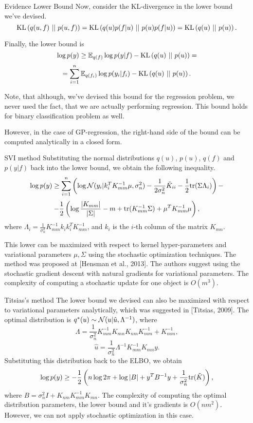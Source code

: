 \begin{frame}{Evidence Lower Bound}
	Now, consider the KL-divergence in the lower bound we've devised.
	$$\mbox{KL}\left(q(u, f)\mbox{ || }p(u, f)\right) = \mbox{KL}\left(q(u) p(f|u)\mbox{ || }p(u) p(f|u)\right) = \mbox{KL}\left(q(u)\mbox{ || }p(u)\right).$$

	Finally, the lower bound is
	$$\log p(y) \ge \mathbb{E}_{q(f)} \log p(y | f) - \mbox{KL}\left(q(u)\mbox{ || }p(u)\right) = $$ $$ = \sum_{i = 1}^{n} \mathbb{E}_{q(f_i)} \log p(y_i | f_i) - \mbox{KL}\left(q(u)\mbox{ || }p(u)\right).$$

	Note, that although, we've devised this bound for the regression problem, we never used the fact, that we are actually performing regression. This bound holds for binary classification problem as well.

	However, in the case of GP-regression, the right-hand side of the bound can be computed analytically in a closed form.
\end{frame}

\begin{frame}{SVI method}
	Substituting the normal distributions $q(u)$, $p(u)$, $q(f)$ and $p(y|f)$ back into the lower bound, we obtain the following inequality.
	$$\log p(y) \ge \sum_{i = 1}^{n} \left( \log \mathcal{N}(y_i | k_i^T K_{mm}^{-1} \mu, \sigma_n^2) - \frac 1 {2 \sigma_n^2} \tilde K_{ii} - \frac 1 2 \mbox{tr} (\Sigma \Lambda_i) \right) - $$
	$$ -\frac 1 2 \left (\log \frac {|K_{mm}|} {|\Sigma|} - m + \mbox{tr}(K_{mm}^{-1} \Sigma) + \mu^T K_{mm}^{-1} \mu \right),$$
	where $\Lambda_i = \frac 1 {\sigma_n^2} K_{mm}^{-1} k_i k_i^T K_{mm}^{-1}$, and $k_i$ is the $i$-th column of the matrix $K_{mn}$.

	This lower can be maximized with respect to kernel hyper-parameters and variational parameters $\mu, \Sigma$ using the stochastic optimization techniques. The method was proposed at [Hensman et al., 2013]. The authors suggest using the stochastic gradient descent with natural gradients for variational parameters. The complexity of computing a stochastic update for one object is $O(m^3)$.
\end{frame}

\begin{frame}{Titsias's method}
	The lower bound we devised can also be maximized with respect to variational parameters analytically, which was suggested in [Titsias, 2009]. The optimal distribution is $q^*(u) \sim \mathcal{N}(u|\hat u, \Lambda^{-1})$, where
	$$\Lambda = \frac 1 {\sigma_n^2} K_{mm}^{-1} K_{mn} K_{nm} K_{mm}^{-1} + K_{mm}^{-1},$$
	$$\hat u = \frac 1 {\sigma_n^2} \Lambda^{-1} K_{mm}^{-1} K_{mn} y.$$
	Substituting this distribution back to the ELBO, we obtain
	$$\log p(y) \ge -\frac 1 2 \left(n \log 2\pi + \log |B| + y^T B^{-1} y + \frac 1 {\sigma_n^2} \mbox{tr}(\tilde K)\right),$$
	where $B = \sigma_n^2 I + K_{nm} K_{mm}^{-1} K_{mn}$. The complexity of computing the optimal distribution parameters, the lower bound and it's gradients is $O(n m^2)$. However, we can not apply stochastic optimization in this case.
\end{frame}

